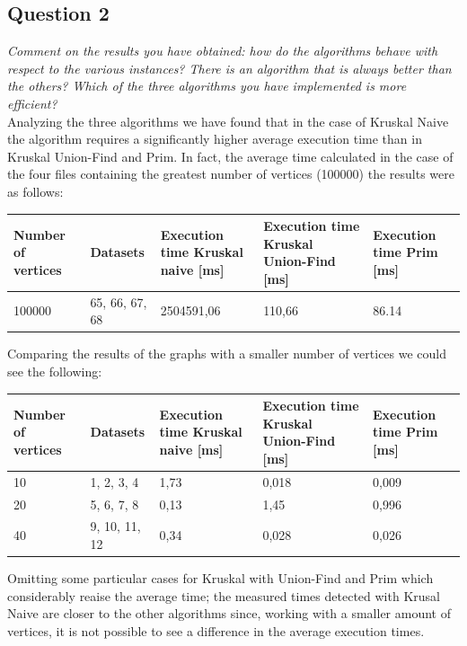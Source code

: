 \subsection{Question 2}
\textit{Comment on the results you have obtained: how do the algorithms behave with respect to the various instances? There is an algorithm that is always better than the others? Which of the three algorithms you have implemented is more efficient?} \\
\noindent
Analyzing the three algorithms we have found that in the case of Kruskal Naive the algorithm requires a significantly higher average execution time than in Kruskal Union-Find and Prim. In fact, the average time calculated in the case of the four files containing the greatest number of vertices (100000) the results were as follows:
\begin{table}[H]\centering
	\begin{tabular}{l|l|l|l|l}
        \textbf{Number of vertices} & \textbf{Datasets} & \textbf{Execution time Kruskal naive [ms]} & \textbf{Execution time Kruskal Union-Find [ms]} & \textbf{Execution time Prim [ms]} \\
    \hline
	    100000 & 65, 66, 67, 68 & 2504591,06  & 110,66 & 86.14 
	\end{tabular}
\end{table}
\noindent
Comparing the results of the graphs with a smaller number of vertices we could see the following:
\begin{table}[H]\centering
	\begin{tabular}{l|l|l|l|l}
        \textbf{Number of vertices} & \textbf{Datasets} & \textbf{Execution time Kruskal naive [ms]} & \textbf{Execution time Kruskal Union-Find [ms]} & \textbf{Execution time Prim [ms]} \\
    \hline
        10 & 1, 2, 3, 4    & 1,73     & 0,018   & 0,009 \\
        20 & 5, 6, 7, 8    & 0,13     & 1,45    & 0,996 \\
        40 & 9, 10, 11, 12 & 0,34     & 0,028   & 0,026 \\
	\end{tabular}
\end{table}
\noindent
Omitting some particular cases for Kruskal with Union-Find and Prim which considerably reaise the average time; the measured times detected with Krusal Naive are closer to the other algorithms since, working with a smaller amount of vertices, it is not possible to see a difference in the average execution times.

